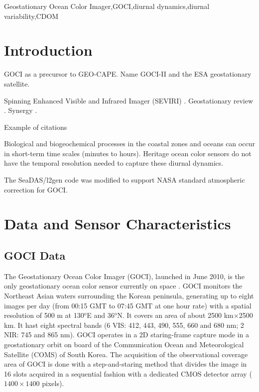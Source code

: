 \documentclass[onecolumn,3p,letterpaper,11pt]{elsarticle}
\begin{document}
\begin{frontmatter}
\begin{abstract}
%
 
%


%

\end{abstract}

\begin{keyword}
Geostationary Ocean Color Imager\sep GOCI\sep diurnal dynamics\sep diurnal variability\sep CDOM
\end{keyword}

\end{frontmatter}
\section{Introduction}
GOCI as a precursor to GEO-CAPE. 
Name GOCI-II and the ESA geostationary satellite.

Spinning Enhanced Visible and Infrared Imager (SEVIRI) \citet{Neukermans2009,Neukermans2012}. Geostationary review \citet{Ruddick2014}. Synergy \citet{Vanhellemont2014}.

Example of citations \citet{Ryu2011,He2013,Hu2016}

Biological and biogeochemical processes in the coastal zones and oceans can occur in short-term time scales (minutes to hours). Heritage ocean color sensors do not have the temporal resolution needed to capture these diurnal dynamics.


The SeaDAS/l2gen code was modified to support NASA standard atmospheric correction for GOCI.
\section{Data and Sensor Characteristics}
\subsection{GOCI Data}
The Geostationary Ocean Color Imager (GOCI), launched in June 2010, is the only geostationary ocean color sensor currently on space \citep{Ryu2012}. GOCI monitors the Northeast Asian waters surrounding the Korean peninsula, generating up to eight images per day (from 00:15 GMT to 07:45 GMT at one hour rate) with a spatial resolution of 500 m at 130$^o$E and 36$^o$N. It covers an area of about 2500 km$\times$2500 km. It hast eight spectral bands (6 VIS: 412, 443, 490, 555, 660 and 680 nm; 2 NIR: 745 and 865 nm). GOCI operates in a 2D staring-frame capture mode in a geostationary orbit on board of the Communication Ocean and Meteorological Satellite (COMS) of South Korea. The acquisition of the observational coverage area of GOCI is done with a step-and-staring method that divides the image in 16 slots acquired in a sequential fashion with a dedicated CMOS detector array ($1400\times1400$ pixels).
\end{document}
